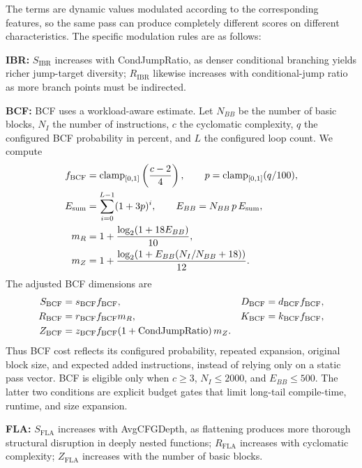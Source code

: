 \documentclass[5p,times,authoryear]{elsarticle}
\theoremstyle{plain}
\theoremstyle{definition}
\theoremstyle{remark}
\begin{document}
The terms are dynamic values modulated according to the corresponding features, so the
same pass can produce completely different scores on different characteristics. The
specific modulation rules are as follows:

\textbf{IBR:} $S_{\text{IBR}}$ increases with CondJumpRatio, as denser conditional
branching yields richer jump-target diversity; $R_{\text{IBR}}$ likewise increases
with conditional-jump ratio as more branch points must be indirected.

\textbf{BCF:} BCF uses a workload-aware estimate.  Let $N_{BB}$ be the number of basic
blocks, $N_I$ the number of instructions, $c$ the cyclomatic complexity, $q$ the configured
BCF probability in percent, and $L$ the configured loop count.  We compute
\begin{align}
f_{\mathrm{BCF}} &= \operatorname{clamp}_{[0,1]}\left(\frac{c-2}{4}\right),
\qquad p = \operatorname{clamp}_{[0,1]}(q/100), \notag \\
E_{\mathrm{sum}} &= \sum_{i=0}^{L-1}(1+3p)^i,
\qquad E_{BB} = N_{BB}\,p\,E_{\mathrm{sum}}, \label{eq:bcf_workload}\\
m_R &= 1+\frac{\log_2(1+18E_{BB})}{10}, \notag \\
m_Z &= 1+\frac{\log_2(1+E_{BB}(N_I/N_{BB}+18))}{12}.
\label{eq:bcf_multipliers}
\end{align}
The adjusted BCF dimensions are
\begin{align}
S_{\mathrm{BCF}}&=s_{\mathrm{BCF}}f_{\mathrm{BCF}}, &
D_{\mathrm{BCF}}&=d_{\mathrm{BCF}}f_{\mathrm{BCF}}, \notag \\
R_{\mathrm{BCF}}&=r_{\mathrm{BCF}}f_{\mathrm{BCF}}m_R, &
K_{\mathrm{BCF}}&=k_{\mathrm{BCF}}f_{\mathrm{BCF}}, \notag \\
Z_{\mathrm{BCF}}&=z_{\mathrm{BCF}}f_{\mathrm{BCF}}(1+\mathrm{CondJumpRatio})\,m_Z.
\end{align}
Thus BCF cost reflects its configured probability, repeated expansion, original block
size, and expected added instructions, instead of relying only on a static pass
vector. BCF is eligible only when $c\geq3$, $N_I\leq2000$, and $E_{BB}\leq500$.  The
latter two conditions are explicit budget gates that limit long-tail compile-time,
runtime, and size expansion.

\textbf{FLA:} $S_{\text{FLA}}$ increases with AvgCFGDepth, as flattening produces
more thorough structural disruption in deeply nested functions;
$R_{\text{FLA}}$ increases with cyclomatic complexity;
$Z_{\text{FLA}}$ increases with the number of basic blocks.
\end{document}
